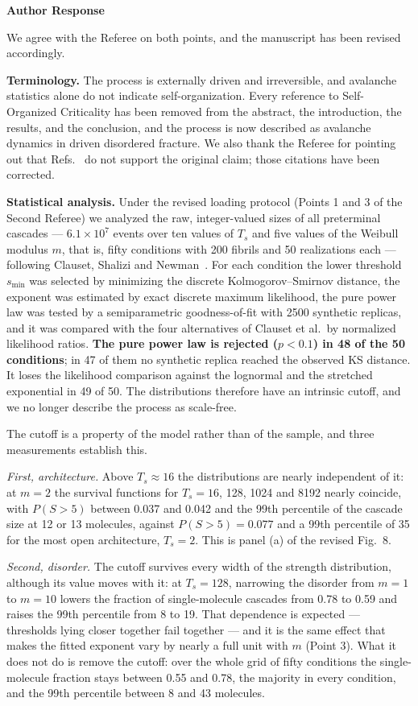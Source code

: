 \documentclass[11pt]{article}
\newcommand{\responselabel}{%
  \par\medskip
  {\color{responseblue}\bfseries Author Response}\par
}
\begin{document}
\responselabel

We agree with the Referee on both points, and the manuscript has been revised
accordingly.

\textbf{Terminology.} The process is externally driven and irreversible, and
avalanche statistics alone do not indicate self-organization. Every reference to
Self-Organized Criticality has been removed from the abstract, the introduction,
the results, and the conclusion, and the process is now described as avalanche
dynamics in driven disordered fracture. We also thank the Referee for pointing
out that Refs.~\cite{Zapperi1997a,Zapperi1999} do not support the original
claim; those citations have been corrected.

\textbf{Statistical analysis.} Under the revised loading protocol (Points 1 and
3 of the Second Referee) we analyzed the raw, integer-valued sizes of all
preterminal cascades --- $6.1\times10^{7}$ events over ten values of $T_s$ and
five values of the Weibull modulus $m$, that is, fifty conditions with 200
fibrils and 50 realizations each --- following Clauset, Shalizi and
Newman~\cite{Clauset2009}. For each condition the lower threshold $s_{\min}$ was
selected by minimizing the discrete Kolmogorov--Smirnov distance, the exponent
was estimated by exact discrete maximum likelihood, the pure power law was
tested by a semiparametric goodness-of-fit with 2500 synthetic replicas, and it
was compared with the four alternatives of Clauset et al.\ by normalized
likelihood ratios. \textbf{The pure power law is rejected ($p<0.1$) in 48 of the
50 conditions}; in 47 of them no synthetic replica reached the observed KS
distance. It loses the likelihood comparison against the lognormal and the
stretched exponential in 49 of 50. The distributions therefore have an intrinsic
cutoff, and we no longer describe the process as scale-free.

The cutoff is a property of the model rather than of the sample, and three
measurements establish this.

\textit{First, architecture.} Above $T_s\approx16$ the distributions are nearly
independent of it: at $m=2$ the survival functions for $T_s=16$, 128, 1024 and
8192 nearly coincide, with $P(S>5)$ between 0.037 and 0.042 and the 99th
percentile of the cascade size at 12 or 13 molecules, against $P(S>5)=0.077$ and
a 99th percentile of 35 for the most open architecture, $T_s=2$. This is panel
(a) of the revised Fig.~8.

\textit{Second, disorder.} The cutoff survives every width of the strength
distribution, although its value moves with it: at $T_s=128$, narrowing the
disorder from $m=1$ to $m=10$ lowers the fraction of single-molecule cascades
from 0.78 to 0.59 and raises the 99th percentile from 8 to 19. That dependence
is expected --- thresholds lying closer together fail together --- and it is the
same effect that makes the fitted exponent vary by nearly a full unit with $m$
(Point 3). What it does not do is remove the cutoff: over the whole grid of
fifty conditions the single-molecule fraction stays between 0.55 and 0.78, the
majority in every condition, and the 99th percentile between 8 and 43 molecules.
\end{document}
